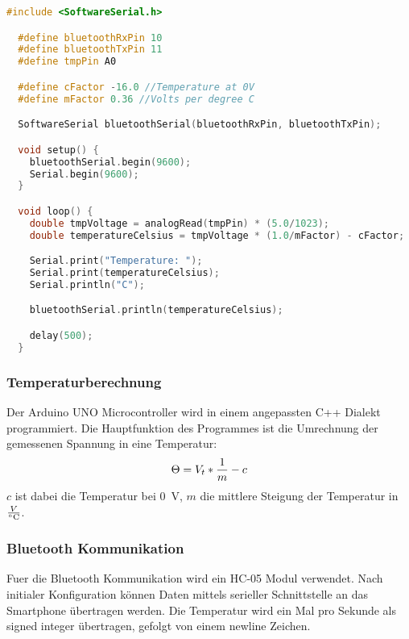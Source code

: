 \documentclass{article}
\begin{document}
  \begin{lstlisting}[language=C++, caption={Arduino code}]
  #include <SoftwareSerial.h>

  #define bluetoothRxPin 10
  #define bluetoothTxPin 11
  #define tmpPin A0

  #define cFactor -16.0 //Temperature at 0V
  #define mFactor 0.36 //Volts per degree C

  SoftwareSerial bluetoothSerial(bluetoothRxPin, bluetoothTxPin);

  void setup() {
    bluetoothSerial.begin(9600);
    Serial.begin(9600);
  }

  void loop() {
    double tmpVoltage = analogRead(tmpPin) * (5.0/1023);
    double temperatureCelsius = tmpVoltage * (1.0/mFactor) - cFactor;

    Serial.print("Temperature: ");
    Serial.print(temperatureCelsius);
    Serial.println("C");

    bluetoothSerial.println(temperatureCelsius);

    delay(500);
  }
  \end{lstlisting}

  \subsubsection{Temperaturberechnung}
    Der Arduino UNO Microcontroller wird in einem angepassten C++ Dialekt
    programmiert. Die Hauptfunktion des Programmes ist die Umrechnung der gemessenen
    Spannung in eine Temperatur:
    \[
    \Theta = V_{t} * {1 \over m} - c
    \]
    $c$ ist dabei die Temperatur bei \SI{0}{\volt}, $m$ die mittlere Steigung der
    Temperatur in $V \over \si{\degreeCelsius}$.

  \subsubsection{Bluetooth Kommunikation}
    Fuer die Bluetooth Kommunikation wird ein HC-05 Modul verwendet. Nach initialer
    Konfiguration können Daten mittels serieller Schnittstelle an das Smartphone
    übertragen werden. Die Temperatur wird ein Mal pro Sekunde als signed integer
    übertragen, gefolgt von einem newline Zeichen.
\end{document}
